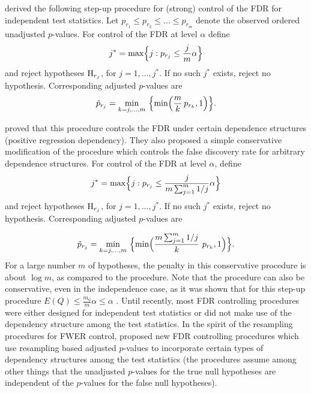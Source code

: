 \documentclass[11pt]{article}
\newcommand{\scst}{\scriptstyle}
\begin{document}
\cite{Benjamini&Hochberg95} derived the following step-up procedure for (strong) control of the FDR for independent test statistics. Let $p_{\scst r_1} \leq p_{\scst r_2} \leq ... \leq p_{\scst r_m}$ denote the observed ordered unadjusted $p$-values. For control of the FDR at level $\alpha$ define 
$$j^* = \max \Bigl\{j: p_{\scst r_j} \leq \frac{j}{m} \alpha \Bigr\}$$
and reject hypotheses ${\rm H}_{\scst r_j}$, for $j=1,\ldots,j^*$. If no such $j^*$ exists, reject no hypothesis. Corresponding adjusted $p$-values are
\begin{equation}\label{eBH}
\tilde{p}_{\scst r_j} = \min_{k = j,\ldots, m}\ \Bigl\{ \min\Bigl(\frac{m}{k} \, p_{\scst r_k}, 1\Bigr) \Bigr\}.
\end{equation}

\cite{Benjamini&Yekutieli01} proved that this procedure controls the FDR under certain dependence structures (positive regression dependency). They also proposed a simple conservative modification of the procedure which controls the false discovery rate for arbitrary dependence structures. For control of the FDR at level $\alpha$, define 
$$ j^* = \max \Bigl\{j: p_{\scst r_j} \leq \frac{j}{m\sum_{j=1}^m 1/j} \alpha \Bigr\}$$ 
and reject hypotheses ${\rm H}_{\scst r_j}$, for $j=1,\ldots,j^*$. If no such $j^*$ exists, reject no hypothesis.  Corresponding adjusted $p$-values are

\begin{equation}\label{eBY}
\tilde{p}_{\scst r_j} = \min_{k = j,\ldots, m}\ \Bigl\{ \min\Bigl (\frac{m \sum_{j=1}^m 1/j}{k} \ p_{\scst r_k}, 1\Bigr) \Bigr\}.
\end{equation}
For a large number $m$ of hypotheses, the penalty in this conservative
procedure is about $\log m$, as compared to the
\cite{Benjamini&Hochberg95} procedure. Note that the
\cite{Benjamini&Hochberg95} procedure can also be conservative,
even in the independence case, as it was shown that for this step-up
procedure $E(Q) \leq \frac{m_0}{m}\alpha \leq \alpha$ . Until recently, most FDR
controlling procedures were either designed for independent test
statistics or did not make use of the dependency structure among
the test statistics. In the spirit of the
\cite{Westfall&Young93} resampling procedures for FWER control,
\cite{Yekutieli&Benjamini99} proposed new FDR controlling
procedures which use resampling based adjusted $p$-values to
incorporate certain types of dependency structures among the test
statistics (the procedures assume among other things that the
unadjusted $p$-values for the true null hypotheses are independent of the $p$-values for the false null hypotheses). \\
\end{document}

